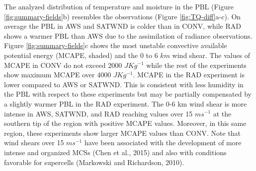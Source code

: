 \documentclass[final,5p,times,twocolumn,authoryear]{elsarticle} %
\begin{document}
The analyzed distribution of temperature and moisture in the PBL (Figure \ref{fig:summary-fields}b) resembles the observations (Figure \ref{fig:TQ-diff}a-c). On average the PBL in AWS and SATWND is colder than in CONV, while RAD shows a warmer PBL than AWS due to the assimilation of radiance observations. Figure \ref{fig:summary-fields}c shows the most unstable convective available potential energy (MCAPE, shaded) and the 0 to 6 \(km\) wind shear. The values of MCAPE in CONV do not exceed 2000 \(JKg^{-1}\) while the rest of the experiments show maximum MCAPE over 4000 \(JKg^{-1}\). MCAPE in the RAD experiment is lower compared to AWS or SATWND. This is consistent with less humidity in the PBL with respect to these experiments but may be partially compensated by a slightly warmer PBL in the RAD experiment. The 0-6 km wind shear is more intense in AWS, SATWND, and RAD reaching values over 15 \(ms^{-1}\) at the southern tip of the region with positive MCAPE values. Moreover, in this same region, these experiments show larger MCAPE values than CONV. Note that wind shears over 15 \(ms^{-1}\) have been associated with the development of more intense and organized MCSs (Chen et al., 2015) and also with conditions favorable for supercells (Markowski and Richardson, 2010).
\end{document}
